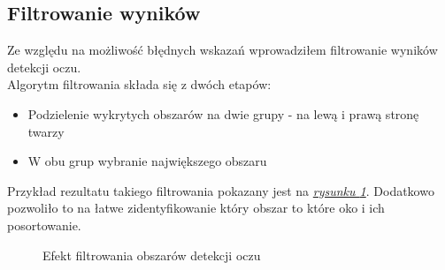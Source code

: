 \subsection{Filtrowanie wyników}

Ze względu na możliwość błędnych wskazań wprowadziłem filtrowanie wyników detekcji oczu. \\
Algorytm filtrowania składa się z dwóch etapów:

\begin{itemize}
    \item Podzielenie wykrytych obszarów na dwie grupy - na lewą i prawą stronę twarzy
    \item W obu grup wybranie największego obszaru
\end{itemize}

Przykład rezultatu takiego filtrowania pokazany jest na \hyperref[{fig:eye_filter}]{\textit{rysunku \ref{fig:eye_filter}}}. Dodatkowo pozwoliło to na łatwe zidentyfikowanie który obszar to które oko i ich posortowanie.

\begin{figure}[!h]
    \begin{center}
        \hspace{8mm}
    \end{center}
    \caption{Efekt filtrowania obszarów detekcji oczu}
    \label{fig:eye_filter}
\end{figure}

